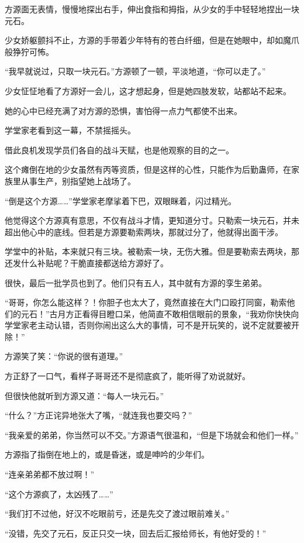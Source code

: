 \begin{this_body}
方源面无表情，慢慢地探出右手，伸出食指和拇指，从少女的手中轻轻地捏出一块元石。

少女娇躯颤抖不止，方源的手带着少年特有的苍白纤细，但是在她眼中，却如魔爪般狰狞可怖。

“我早就说过，只取一块元石。”方源顿了一顿，平淡地道，“你可以走了。”

少女怔怔地看了方源好一会儿，这才想起身，但是她四肢发软，站都站不起来。

她的心中已经充满了对方源的恐惧，害怕得一点力气都使不出来。

学堂家老看到这一幕，不禁摇摇头。

借此良机发现学员们各自的战斗天赋，也是他观察的目的之一。

这个瘫倒在地的少女虽然有丙等资质，但是这样的心性，只能作为后勤蛊师，在家族里从事生产，别指望她上战场了。

“倒是这个方源……”学堂家老摩挲着下巴，双眼眯着，闪过精光。

他觉得这个方源真有意思，不仅有战斗才情，更知道分寸。只勒索一块元石，并未超出他心中的底线。但若是方源要勒索两块，那就过分了，他就得出面干涉。

学堂中的补贴，本来就只有三块。被勒索一块，无伤大雅。但是要勒索去两块，那还发什么补贴呢？干脆直接都送给方源好了。

很快，最后一批学员也到了。他们只有五人，其中就有方源的孪生弟弟。

“哥哥，你怎么能这样？！你胆子也太大了，竟然直接在大门口殴打同窗，勒索他们的元石！”古月方正看得目瞪口呆，他简直不敢相信眼前的景象，“我劝你快快向学堂家老主动认错，否则你闹出这么大的事情，可不是开玩笑的，说不定就要被开除！”

方源笑了笑：“你说的很有道理。”

方正舒了一口气，看样子哥哥还不是彻底疯了，能听得了劝说就好。

但很快他就听到方源又道：“每人一块元石。”

“什么？”方正诧异地张大了嘴，“就连我也要交吗？”

“我亲爱的弟弟，你当然可以不交。”方源语气很温和，“但是下场就会和他们一样。”

方源指了指倒在地上的，或是昏迷，或是呻吟的少年们。

“连亲弟弟都不放过啊！”

“这个方源疯了，太凶残了……”

“我们打不过他，好汉不吃眼前亏，还是先交了渡过眼前难关。”

“没错，先交了元石，反正只交一块，回去后汇报给师长，有他好受的！”


\end{this_body}
